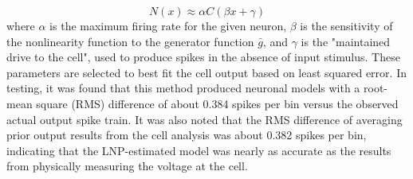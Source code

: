 \begin{equation}
    \label{nonlinLnp}
    N(x) \approx \alpha C(\beta x + \gamma )
\end{equation}
where $\alpha$ is the maximum firing rate for the given neuron, $\beta$ is the sensitivity of the nonlinearity function to the generator function $\bar{g}$, and $\gamma$ is the "maintained drive to the cell", used to produce spikes in the absence of input stimulus. These parameters are selected to best fit the cell output based on least squared error. In testing, it was found that this method produced neuronal models with a root-mean square (RMS) difference of about 0.384 spikes per bin versus the observed actual output spike train. It was also noted that the RMS difference of averaging prior output results from the cell analysis was about 0.382 spikes per bin, indicating that the LNP-estimated model was nearly as accurate as the results from physically measuring the voltage at the cell.


